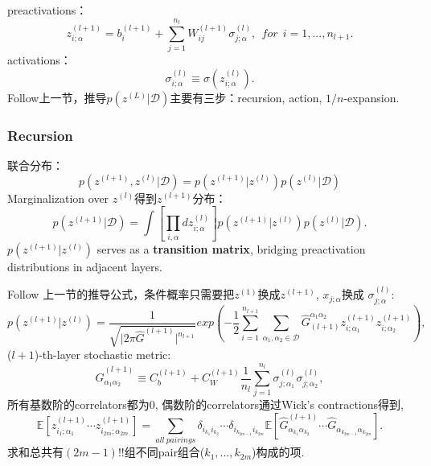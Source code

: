 preactivations：
\begin{equation}
    z_{i;\alpha}^{(l+1)} = b_i^{(l+1)} + \sum_{j=1}^{n_l}W_{ij}^{(l+1)}\sigma_{j;\alpha}^{(l)},
    ~~for ~~ i=1,...,n_{l+1}.
\end{equation}
activations：
\begin{equation}
    \sigma_{i;\alpha}^{(l)} \equiv \sigma(z_{i;\alpha}^{(l)}).
\end{equation}
Follow上一节，推导$p\left(z^{(L)}\big| \mathcal{D}\right)$主要有三步：recursion, action,
$1/n$-expansion.

\subsubsection{Recursion}
联合分布：
\begin{equation}
    p\left(z^{(l+1)}, z^{(l)}\big| \mathcal{D}\right) = 
    p\left(z^{(l+1)}\big| z^{(l)}\right)p\left(z^{(l)}\big| \mathcal{D}\right)
\end{equation}
Marginalization over $z^{(l)}$得到$z^{(l+1)}$分布：
\begin{equation}
    p\left(z^{(l+1)}\big| \mathcal{D}\right) = \int \left[\prod_{i,\alpha}dz_{i;\alpha}^{(l)}
    \right]p\left(z^{(l+1)}\big| z^{(l)}\right)p\left(z^{(l)}\big| \mathcal{D}\right).
\end{equation}
$p\left(z^{(l+1)}\big| z^{(l)}\right)$ serves as a \textbf{transition matrix}, bridging 
preactivation distributions in adjacent layers.

Follow 上一节的推导公式，条件概率只需要把$z^{(1)}$换成$z^{(l+1)}$, $x_{j;\alpha}$换成
$\sigma_{j;\alpha}^{(l)}$:
\begin{equation}
    p\left(z^{(l+1)}\big| z^{(l)}\right) = \frac{1}{\sqrt{\big|2\pi \hat{G}^{(l+1)}\big|^{n_{l+1}}}}
    exp\left(-\frac{1}{2}\sum_{i=1}^{n_{l+1}}\sum_{\alpha_1,\alpha_2\in\mathcal{D}}
    \hat{G}_{(l+1)}^{\alpha_1\alpha_2}z_{i;\alpha_1}^{(l+1)}z_{i;\alpha_2}^{(l+1)}\right),
\end{equation}
($l+1$)-th-layer stochastic metric:
\begin{equation}
   \hat{G}_{\alpha_1\alpha_2}^{(l+1)} \equiv C_b^{(l+1)} + C_W^{(l+1)} \frac{1}{n_l}
   \sum_{j=1}^{n_l}\sigma_{j;\alpha_1}^{(l)}\sigma_{j;\alpha_2}^{(l)},
\end{equation}
所有基数阶的correlators都为$0$, 偶数阶的correlators通过Wick's contractions得到,
\begin{equation}
    \mathbb{E}\left[z_{i_1;\alpha_1}^{(l+1)}\cdots z_{i_{2m};\alpha_{2m}}^{(l+1)}\right]
    = \sum_{all~pairings} \delta_{i_{k_1}i_{k_2}}\cdots\delta_{i_{k_{2m-1}}i_{k_{2m}}}
    \mathbb{E}\left[\hat{G}_{\alpha_{k_1}\alpha_{k_2}}^{(l+1)}\cdots
    \hat{G}_{\alpha_{k_{2m-1}}\alpha_{k_{2m}}} \right].
\end{equation}
求和总共有$(2m-1)!!$组不同pair组合($k_1,...,k_{2m}$)构成的项.

